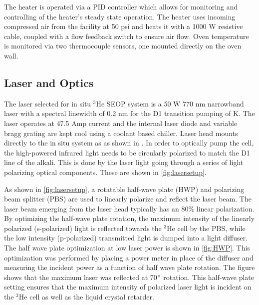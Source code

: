 The heater is operated via a PID controller which allows for monitoring and controlling of the heater’s steady state operation. The heater uses incoming compressed air from the facility at 50 psi and heats it with a 1000 W resistive cable, coupled with a flow feedback switch to ensure air flow. Oven temperature is monitored via two thermocouple sensors, one mounted directly on the oven wall. 

\subsection{Laser and Optics}

The laser selected for in situ $^3$He SEOP system is a 50 W 770 nm narrowband laser with a spectral linewidth of 0.2 nm for the D1 transition pumping of K. The laser operates at 47.5 Amp current and the internal laser diode and variable bragg grating are kept cool using a coolant based chiller. Laser head mounts directly to the in situ system as as shown in . In order to optically pump the cell, the high-powered infrared light needs to be circularly polarized to match the D1 line of the alkali. This is done by the laser light going through a series of light polarizing optical components. These are shown in \cref{fig:lasersetup}. 

As shown in \cref{fig:lasersetup}, a rotatable half-wave plate (HWP) and polarizing beam splitter (PBS) are used to linearly polarize and reflect the laser beam. The laser beam emerging from the laser head typically has an 80\% linear polarization. By optimizing the half-wave plate rotation, the maximum intensity of the linearly polarized (s-polarized) light is reflected towards the $^3$He cell by the PBS, while the low intensity (p-polarized) transmitted light is dumped into a light diffuser. The half wave plate optimization at low laser power is shown in \cref{fig:HWP}. This optimization was performed by placing a power meter in place of the diffuser and measuring the incident power as a function of half wave plate rotation. The figure shows that the maximum laser was reflected at 70$\degree$ rotation. This half-wave plate setting ensures that the maximum intensity of polarized laser light is incident on the $^3$He cell as well as the liquid crystal retarder. 

